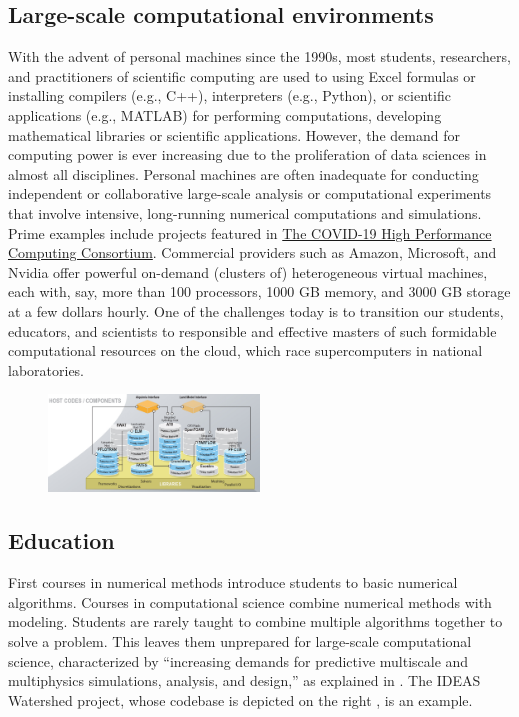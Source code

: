 \documentclass{amsart}
\begin{document}
\subsection{Large-scale computational environments} 
With the advent of personal machines since the 1990s, most students, researchers, and practitioners of scientific computing are used to using Excel formulas or installing compilers (e.g., C++), interpreters (e.g., Python), or scientific applications (e.g., MATLAB) for performing computations, developing mathematical libraries or scientific applications. However, the demand for computing power is ever increasing due to the proliferation of data sciences in almost all disciplines. Personal machines are often inadequate for conducting independent or collaborative large-scale analysis or computational experiments that involve intensive, long-running numerical computations and simulations. Prime examples include projects featured in \href{https://covid19-hpc-consortium.org}{The COVID-19 High Performance Computing Consortium}. Commercial providers such as Amazon, Microsoft, and Nvidia offer powerful on-demand (clusters of) heterogeneous virtual machines, each with, say, more than 100 processors, 1000 GB memory, and 3000 GB storage at  a few dollars hourly. One of the challenges today is to transition our students, educators, and scientists to  responsible and effective masters of such formidable computational resources on the cloud, which race supercomputers in national laboratories.


\begin{figure}
    \includegraphics[width = 0.5\textwidth]{cropped-ideas-watersheds-software-ecosystem-road.jpg}
\end{figure}

\subsection{Education} 
First courses in numerical methods \cite{BurFaiBur16a} introduce students to  basic numerical algorithms.  Courses in computational science \cite{HolEic19a,ShifShif14a} combine numerical methods with modeling.  Students are rarely taught to combine multiple algorithms together to solve a problem.  This leaves them unprepared for  large-scale computational science, characterized by  ``increasing demands for predictive multiscale and multiphysics simulations, analysis, and design,'' as explained in \cite{IDEASAbout}.  The IDEAS Watershed project, whose codebase is depicted on the right \cite{IDEASWatershedPict}, is an example.
\end{document}
